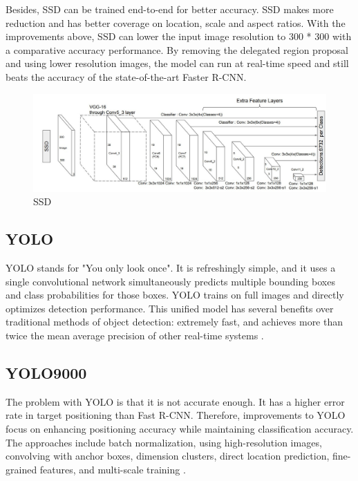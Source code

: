 \documentclass{article}
\begin{document}
Besides, SSD can be trained end-to-end for better accuracy. SSD makes more reduction and has better coverage on location, scale and aspect ratios. With the improvements above, SSD can lower the input image resolution to 300 * 300 with a comparative accuracy performance. By removing the delegated region proposal and using lower resolution images, the model can run at real-time speed and still beats the accuracy of the state-of-the-art Faster R-CNN.

\begin{figure}[h]
\centering
\includegraphics[scale=0.25]{SSD.jpeg}
\caption{SSD\cite{liu2016ssd}}
\label{fig:SSD}
\end{figure}

\subsection{YOLO}

YOLO stands for "You only look once". It is refreshingly simple, and it uses a single convolutional network simultaneously predicts multiple bounding boxes and class probabilities for those boxes. YOLO trains on full images and directly optimizes detection performance. This unified model has several benefits over traditional methods of object detection: extremely fast, and achieves more than twice the mean average precision of other real-time systems \cite{YOLO}.

\subsection{YOLO9000}

The problem with YOLO is that it is not accurate enough. It has a higher error rate in target positioning than Fast R-CNN. Therefore, improvements to YOLO focus on enhancing positioning accuracy while maintaining classification accuracy. The approaches include batch normalization, using high-resolution images, convolving with anchor boxes, dimension clusters, direct location prediction, fine-grained features, and multi-scale training \cite{YOLO9000}.
\end{document}
